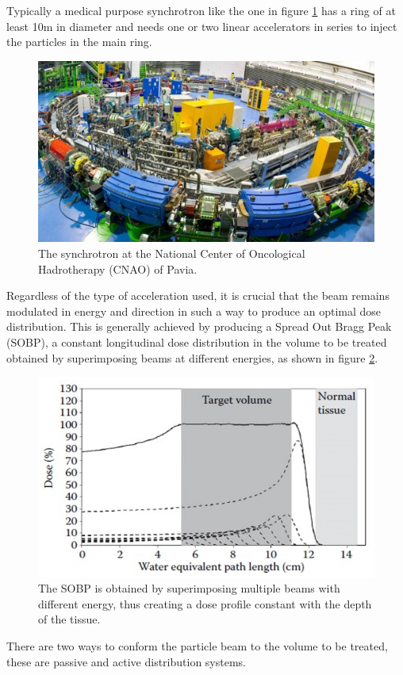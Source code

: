 Typically a medical purpose synchrotron like the one in figure \ref{fig:sincrotrone} has a ring of at least 10m in diameter and needs one or two linear accelerators in series to inject the particles in the main ring.
\begin{figure}[H]
	\centering
	\includegraphics[width=0.7\linewidth]{IMG/ch1/Sincrotrone}
	\caption{The synchrotron at the National Center of Oncological Hadrotherapy (CNAO) of Pavia.}
	\label{fig:sincrotrone}
\end{figure}
\noindent Regardless of the type of acceleration used, it is crucial that the beam remains modulated in energy and direction in such a way to produce an optimal dose distribution. This is generally achieved by producing a Spread Out Bragg Peak (SOBP), a constant longitudinal dose distribution in the volume to be treated obtained by superimposing beams at different energies, as shown in figure \ref{fig:sobp}.
\begin{figure}[H]
	\centering
	\includegraphics[width=0.7\linewidth]{IMG/ch1/SOBP}
	\caption{The SOBP is obtained by superimposing multiple beams with different energy, thus creating a dose profile constant with the depth of the tissue\cite{sobp}.}
	\label{fig:sobp}
\end{figure}
\noindent There are two ways to conform the particle beam to the volume to be treated, these are passive and active distribution systems.

